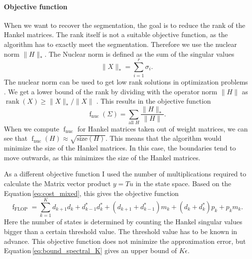 \documentclass[doctype=mastersthesis,BCOR=15mm,biblatex]{ldvbook}%
\DeclareMathOperator{\rank}{rank}
\DeclareMathOperator{\f}{f}
\newcommand{\da}{d^*} %
\begin{document}
\paragraph{Objective function}
When we want to recover the segmentation, the goal is to reduce the rank of the Hankel matrices.
The rank itself is not a suitable objective function, as the algorithm has to exactly meet the segmentation.
Therefore we use the nuclear norm $\|H\|_*$.
The Nuclear norm is defined as the sum of the singular values
\begin{equation}
	\|X\|_* = \sum_{i=1}^r \sigma_i
	.
\end{equation}
The nuclear norm can be used to get low rank solutions in optimization problems \cite{liu_interior-point_2010}.
We get a lower bound of the rank by dividing with the operator norm $\|H\|$ as $\rank(X) \geq \|X\|_*/\|X\|$ \cite{recht_guaranteed_2010}.
This results in the objective function
\begin{equation}\label{eq:objective_nuc}
	\f_{\text{nuc}}(\Sigma)= \sum_{\text{all } H} \frac{\|H\|_*}{\|H\|}
	.
\end{equation}
When we compute $\f_{\text{nuc}}$ for Hankel matrices taken out of weight matrices, we can see that $\f_{\text{nuc}}(H) \approx \sqrt{\text{size}(H)}$.
This means that the algorithm would minimize the size of the Hankel matrices.
In this case, the boundaries tend to move outwards, as this minimizes the size of the Hankel matrices.


As a different objective function I used the number of multiplications required to calculate the Matrix vector product $y=Tu$ in the state space.
Based on the Equation\,\ref{eq:cost_mixed}, this gives the objective function
\begin{equation}\label{eq:objective_flop}
\f_{\text{FLOP}} = \sum_{k=1}^Kd_{k+1}d_k + \da_{k-1}\da_k + (d_{k+1}+\da_{k-1})m_k +(d_k+\da_k)p_k +p_km_k 
.
\end{equation}
Here the number of states is determined by counting the Hankel singular values bigger than a certain threshold value. 
The threshold value has to be known in advance.
This objective function does not minimize the approximation error, but Equation\,\ref{eq:bound_spectral_K} gives an upper bound of $K\epsilon$.
\end{document}
